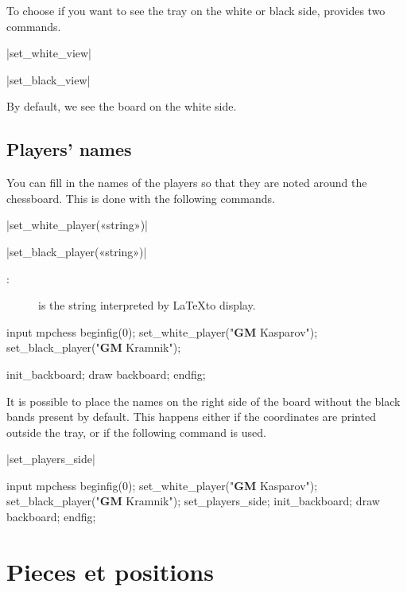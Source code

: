 \documentclass[english]{ltxdoc}
\begin{document}
To choose if you want to see the tray on the white or black side, \mpchess
provides two commands. 

\commande|set_white_view|\smallskip

\commande|set_black_view|\smallskip

By default, we see the board on the white side.

\subsection{Players' names}

You can fill in the names of the players so that they are noted around the
chessboard. This is done with the following commands. 

\commande|set_white_player(«string»)|\smallskip

\commande|set_black_player(«string»)|\smallskip

\begin{description}
  \item[ :] is the string interpreted by \LaTeX to display.
\end{description}

\begin{ExempleMP}
input mpchess
beginfig(0);
set_white_player("\textbf{GM} Kasparov");
set_black_player("\textbf{GM} Kramnik");

init_backboard;
draw backboard;
endfig;
\end{ExempleMP}

It is possible to place the names on the right side of the board without the
black bands present by default. 
This happens either if the coordinates are printed outside the tray, or if the
following command is used.

\commande|set_players_side|\smallskip

\begin{ExempleMP}[righthand width=0.6\linewidth]
input mpchess
beginfig(0);
set_white_player("\textbf{GM} Kasparov");
set_black_player("\textbf{GM} Kramnik");
set_players_side;
init_backboard;
draw backboard;
endfig;
\end{ExempleMP}



\section{Pieces et positions}
\end{document}
